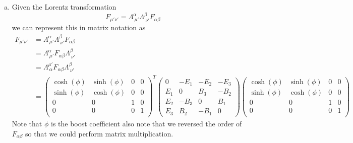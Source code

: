 \documentclass[11pt]{article}
\numberwithin{equation}{section}
\begin{document}
\begin{enumerate}[(a)]
\item
Given the Lorentz transformation 
$$F_{\mu'\nu'} = \Lambda^{\alpha}_{\ \mu'}\Lambda^{\beta}_{\ \nu'}F_{\alpha \beta}$$
we can represent this in matrix notation as
\begin{align*}
F_{\mu'\nu'} &= \Lambda^{\alpha}_{\ \mu'}\Lambda^{\beta}_{\ \nu'}F_{\alpha \beta}\\
&= \Lambda^{\alpha}_{\ \mu'}F_{\alpha \beta}\Lambda^{\beta}_{\ \nu'}\\
&= \Lambda_{\ \alpha}^{\mu'}F_{\alpha \beta}\Lambda^{\beta}_{\ \nu'}\\
&= \left(\begin{array}{cccc}
	\cosh(\phi) &\sinh(\phi) &0 &0\\
	\sinh(\phi) &\cosh(\phi) &0 &0\\
	0 &0 &1 &0\\
	0 &0 &0 &1\\
		\end{array}\right)^T
		\left(\begin{array}{cccc}
		0 &-E_1 &-E_2 &-E_3\\
		E_1 &0 &B_3 &-B_2\\
		E_2 &-B_3 &0 &B_1\\
		E_3 &B_2 &-B_1 &0
		\end{array}\right)
		\left(\begin{array}{cccc}
	\cosh(\phi) &\sinh(\phi) &0 &0\\
	\sinh(\phi) &\cosh(\phi) &0 &0\\
	0 &0 &1 &0\\
	0 &0 &0 &1\\
		\end{array}\right)
\end{align*}
Note that $\phi$ is the boost coefficient also note that we reversed the order of $F_{\alpha\beta}$ so that we could perform matrix multiplication.
\end{enumerate}
\end{document}
